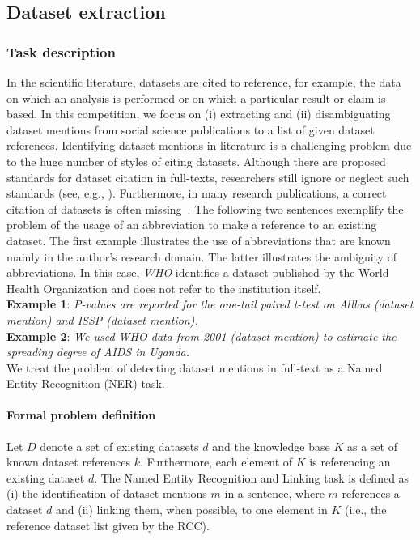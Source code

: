 \subsection{Dataset extraction}
\label{sec:dataset-extraction}
\subsubsection{Task description}
In the scientific literature, datasets are cited to reference, for example, the data on which an analysis is performed or on which a particular result or claim is based.
In this competition, we focus on (i) extracting and (ii) disambiguating dataset mentions from social science publications to a list of given dataset references.
Identifying dataset mentions in literature is a challenging problem due to the huge number of styles of citing datasets. Although there are proposed standards for dataset citation in full-texts, researchers still ignore or neglect such standards (see, e.g., \cite{altman2007proposed}).
Furthermore, in many research publications, a correct citation of datasets is often missing~\cite{boland2012identifying}. 
The following two sentences exemplify the problem of the usage of an abbreviation to make a reference to an existing dataset.
The first example illustrates the use of abbreviations that are known mainly in the author's research domain.
The latter illustrates the ambiguity of abbreviations.
In this case, \emph{WHO} identifies a dataset published by the World Health Organization and does not refer to the institution itself.\\
\textbf{Example 1}: \emph{P-values are reported for the one-tail paired t-test on \emph{Allbus} (dataset mention) and \emph{ISSP} (dataset mention).}\\
\textbf{Example 2}: \emph{We used \emph{WHO data from 2001} (dataset mention) to estimate the spreading degree of AIDS in Uganda.}\\
We treat the problem of detecting dataset mentions in full-text as a Named Entity Recognition (NER) task. 
\paragraph{Formal problem definition}%
Let $D$ denote a set of existing datasets $d$ and the knowledge base $K$ as a set of known dataset references $k$. Furthermore, each element of $K$ is referencing an existing dataset $d$. The Named Entity Recognition and Linking task is defined as (i) the identification of dataset mentions $m$ in a sentence, where $m$ references a dataset $d$ and (ii) linking them, when possible, to one element in $K$ (i.e., the reference dataset list given by the RCC). 


